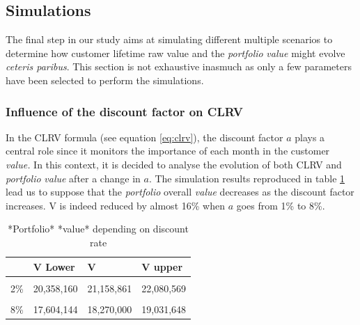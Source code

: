 \documentclass[
]{book}
\begin{document}
\hypertarget{simulations}{%
\subsection{Simulations}\label{simulations}}

The final step in our study aims at simulating different multiple scenarios to determine how customer lifetime raw value and the \emph{portfolio} \emph{value} might evolve \emph{ceteris paribus}. This section is not exhaustive inasmuch as only a few parameters have been selected to perform the simulations.

\hypertarget{influence-of-the-discount-factor-on-clrv}{%
\subsubsection*{Influence of the discount factor on CLRV}\label{influence-of-the-discount-factor-on-clrv}}

In the CLRV formula (see equation \eqref{eq:clrv}), the discount factor \(a\) plays a central role since it monitors the importance of each month in the customer \emph{value.} In this context, it is decided to analyse the evolution of both CLRV and \emph{portfolio} \emph{value} after a change in \(a\). The simulation results reproduced in table \ref{tab:portValDiscountTab} lead us to suppose that the \emph{portfolio} overall \emph{value} decreases as the discount factor increases. V is indeed reduced by almost 16\% when \(a\) goes from 1\% to 8\%.

\begin{table}[H]

\caption{\label{tab:portValDiscountTab}*Portfolio* *value* depending on discount rate}
\centering
\begin{tabular}[t]{llll}
\toprule
  & V Lower & V & V upper\\
\midrule
\cellcolor{gray!6}{1\%} & \cellcolor{gray!6}{20,894,006} & \cellcolor{gray!6}{21,721,297} & \cellcolor{gray!6}{22,674,662}\\
2\% & 20,358,160 & 21,158,861 & 22,080,569\\
\cellcolor{gray!6}{4\%} & \cellcolor{gray!6}{19,357,495} & \cellcolor{gray!6}{20,108,832} & \cellcolor{gray!6}{20,971,852}\\
8\% & 17,604,144 & 18,270,000 & 19,031,648\\
\bottomrule
\end{tabular}
\end{table}
\end{document}
